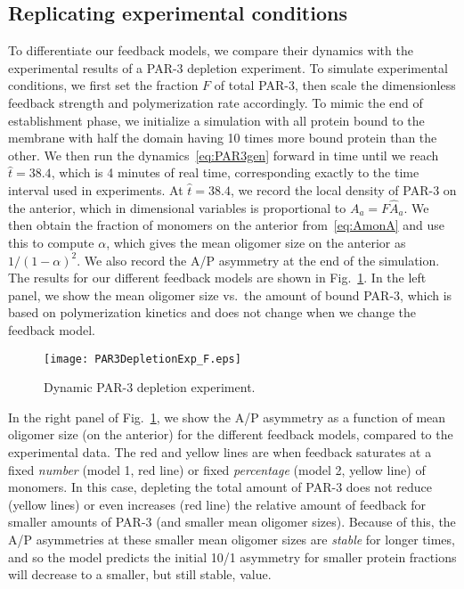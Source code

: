 \documentclass[11pt]{article}
\newcommand{\6}[1]{#1_{\text{6}}}
\newcommand{\3}[1]{#1_{\text{3}}}
\begin{document}
\subsection{Replicating experimental conditions}
To differentiate our feedback models, we compare their dynamics with the experimental results of a PAR-3 depletion experiment. To simulate experimental conditions, we first set the fraction $F$ of total PAR-3, then scale the dimensionless feedback strength and polymerization rate accordingly. To mimic the end of establishment phase, we initialize a simulation with all protein bound to the membrane with half the domain having 10 times more bound protein than the other. We then run the dynamics\ \eqref{eq:PAR3gen} forward in time until we reach $\hat t = 38.4$, which is 4 minutes of real time, corresponding exactly to the time interval used in experiments. At $\hat t = 38.4$, we record the local density of PAR-3 on the anterior, which in dimensional variables is proportional to $A_a=F \hat A_a$. We then obtain the fraction of monomers on the anterior from\ \eqref{eq:AmonA} and use this to compute $\alpha$, which gives the mean oligomer size on the anterior as $1/(1-\alpha)^2$. We also record the A/P asymmetry at the end of the simulation. The results for our different feedback models are shown in Fig.\ \ref{fig:P3DeplF}. In the left panel, we show the mean oligomer size vs.\ the amount of bound PAR-3, which is based on polymerization kinetics and does not change when we change the feedback model.

\begin{figure}
\centering
\texttt{[image: PAR3DepletionExp\_F.eps]}
\caption{\label{fig:P3DeplF}Dynamic PAR-3 depletion experiment. }
\end{figure}

In the right panel of Fig.\ \ref{fig:P3DeplF}, we show the A/P asymmetry as a function of mean oligomer size (on the anterior) for the different feedback models, compared to the experimental data. The red and yellow lines are when feedback saturates at a fixed \emph{number} (model 1, red line) or fixed \emph{percentage} (model 2, yellow line) of monomers. In this case, depleting the total amount of PAR-3 does not reduce (yellow lines) or even increases (red line) the relative amount of feedback for smaller amounts of PAR-3 (and smaller mean oligomer sizes). Because of this, the A/P asymmetries at these smaller mean oligomer sizes are \emph{stable} for longer times, and so the model predicts the initial 10/1 asymmetry for smaller protein fractions will decrease to a smaller, but still stable, value. 
\end{document}
